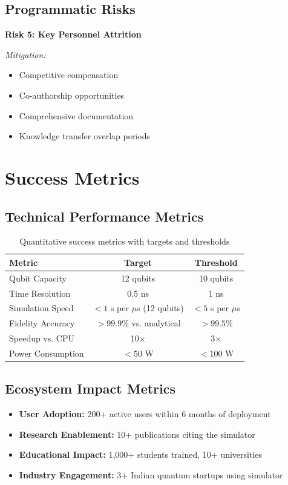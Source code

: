\documentclass[12pt,a4paper]{article}
\begin{document}
\subsection{Programmatic Risks}

\textbf{Risk 5: Key Personnel Attrition}

\textit{Mitigation:}
\begin{itemize}[noitemsep]
    \item Competitive compensation
    \item Co-authorship opportunities
    \item Comprehensive documentation
    \item Knowledge transfer overlap periods
\end{itemize}

\newpage
\section{Success Metrics}

\subsection{Technical Performance Metrics}

\begin{table}[htbp]
\centering
\begin{tabular}{lcc}
\toprule
\textbf{Metric} & \textbf{Target} & \textbf{Threshold} \\
\midrule
Qubit Capacity & 12 qubits & 10 qubits \\
Time Resolution & 0.5 ns & 1 ns \\
Simulation Speed & $<1$ s per $\mu$s (12 qubits) & $<5$ s per $\mu$s \\
Fidelity Accuracy & $>99.9\%$ vs. analytical & $>99.5\%$ \\
Speedup vs. CPU & 10$\times$ & 3$\times$ \\
Power Consumption & $<50$ W & $<100$ W \\
\bottomrule
\end{tabular}
\caption{Quantitative success metrics with targets and thresholds}
\label{tab:metrics}
\end{table}

\subsection{Ecosystem Impact Metrics}

\begin{itemize}[noitemsep]
    \item \textbf{User Adoption:} 200+ active users within 6 months of deployment
    \item \textbf{Research Enablement:} 10+ publications citing the simulator
    \item \textbf{Educational Impact:} 1,000+ students trained, 10+ universities
    \item \textbf{Industry Engagement:} 3+ Indian quantum startups using simulator
\end{itemize}
\end{document}

